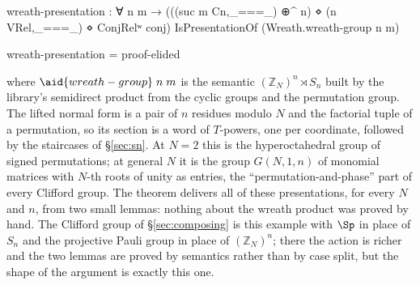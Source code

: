 \begingroup\renewcommand{\AgdaCodeStyle}{\footnotesize}
\begin{code}
wreath-presentation : ∀ n m → (((suc m Cn,_===_) ⊕^ n) ⋄ (n VRel,_===_) ⋄ ConjRelʷ conj)
                                IsPresentationOf (Wreath.wreath-group n m)
\end{code}
\endgroup
\begin{code}[hide]
wreath-presentation = proof-elided
\end{code}

\noindent where $\aid{wreath-group}\;n\;m$ is the semantic
$(\mathbb{Z}_N)^n \rtimes S_n$ built by the library's semidirect
product from the cyclic groups and the permutation group.  The lifted
normal form is a pair of $n$ residues modulo $N$ and the factorial tuple
of a permutation, so its section is a word of $T$-powers, one per
coordinate, followed by the staircases of \S\ref{sec:sn}.  At $N = 2$
this is the hyperoctahedral group of signed permutations; at general
$N$ it is the group $G(N,1,n)$ of monomial matrices with $N$-th roots of
unity as entries, the ``permutation-and-phase'' part of every Clifford
group.  The theorem delivers all of these presentations, for every $N$
and $n$, from two small lemmas: nothing about the wreath product was
proved by hand.  The Clifford group of \S\ref{sec:composing} is this
example with $\Sp$ in place of $S_n$ and the projective Pauli group in
place of $(\mathbb{Z}_N)^n$; there the action is richer and the two
lemmas are proved by semantics rather than by case split, but the shape
of the argument is exactly this one.
